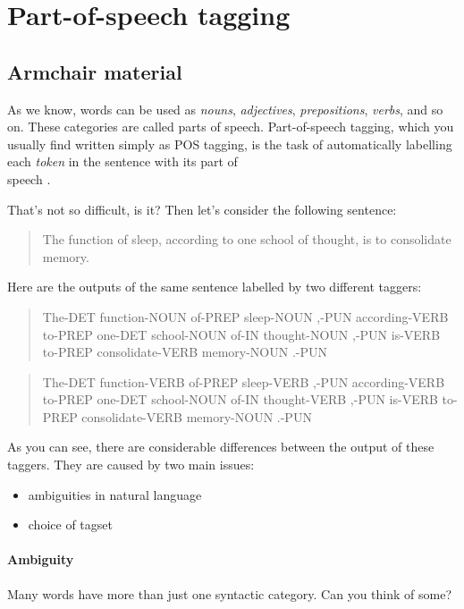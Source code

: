 \documentclass[11pt]{article}
\newcommand{\mnote}[1]
{
  \marginpar{\small #1}
  #1
}
\begin{document}
\section{Part-of-speech tagging}\label{section:tok}

\subsection*{Armchair material}

As we know, words can be used as \textit{nouns}, \textit{adjectives},
\textit{prepositions}, \textit{verbs}, and so on. These categories are
called parts of speech. Part-of-speech tagging, which you usually find
written simply as POS tagging, is the task of automatically labelling
each \textit{token} in the sentence with its \mnote{part of\\ speech}.

That's not so difficult, is it? Then let's consider the following sentence:

\begin{quote}
The function of sleep, according to one school of thought, is to consolidate memory.
\end{quote}

Here are the outputs of the same sentence labelled by two different taggers:

\begin{quote}
The-DET function-NOUN of-PREP sleep-NOUN ,-PUN according-VERB to-PREP one-DET school-NOUN of-IN thought-NOUN ,-PUN is-VERB to-PREP consolidate-VERB memory-NOUN .-PUN
\end{quote}

\begin{quote}
The-DET function-VERB of-PREP sleep-VERB ,-PUN according-VERB to-PREP one-DET school-NOUN of-IN thought-VERB ,-PUN is-VERB to-PREP consolidate-VERB memory-NOUN .-PUN
\end{quote}


As you can see, there are considerable differences between the output of these taggers. They are caused by two main issues:

\begin{itemize}
\item ambiguities in natural language
\item choice of tagset 
\end{itemize}

\paragraph{Ambiguity} Many words have more than just one syntactic category. Can you think of some?
\end{document}
